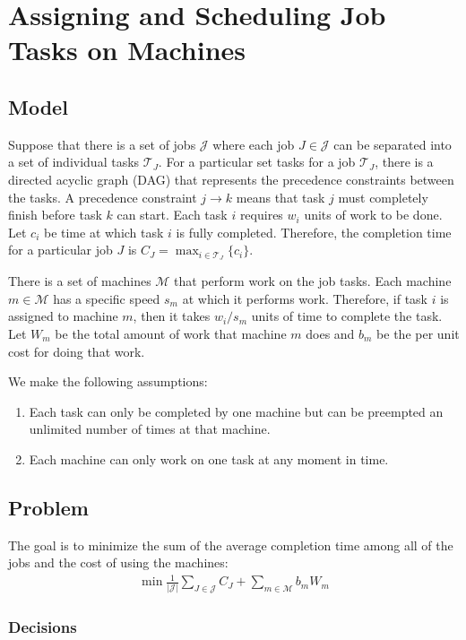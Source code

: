 \section{Assigning and Scheduling Job Tasks on Machines}

\subsection{Model}
Suppose that there is a set of jobs $\mathcal{J}$ where each job $J\in\mathcal{J}$ can be separated into a set of individual tasks $\mathcal{T}_J$.
For a particular set tasks for a job $\mathcal{T}_J$, there is a directed acyclic graph (DAG) that represents the precedence constraints between the tasks.
A precedence constraint $j\rightarrow k$ means that task $j$ must completely finish before task $k$ can start.
Each task $i$ requires $w_i$ units of work to be done.
Let $c_i$ be time at which task $i$ is fully completed.
Therefore, the completion time for a particular job $J$ is $C_J=\max_{i\in\mathcal{T}_J}\{c_i\}$.

There is a set of machines $\mathcal{M}$ that perform work on the job tasks.
Each machine $m\in\mathcal{M}$ has a specific speed $s_m$ at which it performs work.
Therefore, if task $i$ is assigned to machine $m$, then it takes $w_i/s_m$ units of time to complete the task.
Let $W_m$ be the total amount of work that machine $m$ does and $b_m$ be the per unit cost for doing that work.

We make the following assumptions:
\begin{enumerate}
	\item Each task can only be completed by one machine but can be preempted an unlimited number of times at that machine.
	\item Each machine can only work on one task at any moment in time.
\end{enumerate}

\subsection{Problem}

The goal is to minimize the sum of the average completion time among all of the jobs and the cost of using the machines:
\begin{align}
	\min \frac{1}{|\mathcal{J}|}\sum_{J\in\mathcal{J}} C_J + \sum_{m\in\mathcal{M}} b_mW_m \label{eq:gen_prob}
\end{align}

\subsubsection{Decisions}

